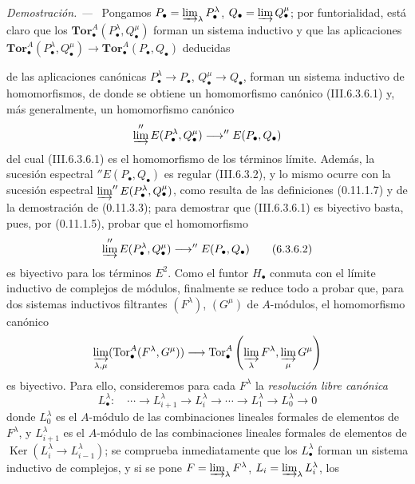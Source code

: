 \documentclass[10pt,oneside]{book}
\newcommand{\sref}[2][]{\textup{(#2)}}
\newcommand{\oldpage}[2][]{\setcounter{footnote}{0}\marginpar{\scriptsize\textbf{#1}~|~#2}\ignorespaces}
\newenvironment{proof}{\par\medskip\noindent\textit{Demostración. ---\ }}{\par}
\begin{document}
\begin{proof}
Pongamos $P_\bullet=\varinjlim_\lambda P_\bullet^\lambda$,
$Q_\bullet=\varinjlim Q_\bullet^\mu$; por funtorialidad, está claro que
los $\mathbf{Tor}_\bullet^A(P_\bullet^\lambda,Q_\bullet^\mu)$ forman un
sistema inductivo y que las aplicaciones
$\mathbf{Tor}_\bullet^A(P_\bullet^\lambda,Q_\bullet^\mu)\to
\mathbf{Tor}_\bullet^A(P_\bullet,Q_\bullet)$ deducidas

\oldpage[III]{143}

de las aplicaciones canónicas $P_\bullet^\lambda\to P_\bullet$,
$Q_\bullet^\mu\to Q_\bullet$, forman un sistema inductivo de homomorfismos,
de donde se obtiene un homomorfismo canónico \sref{III.6.3.6.1} y, más
generalmente,
un homomorfismo canónico
\[
  \varinjlim''E(P_\bullet^\lambda,Q_\bullet^\mu)
  \longrightarrow ''E(P_\bullet,Q_\bullet)
\]
del cual \sref{III.6.3.6.1} es el homomorfismo de los términos límite.
Además, la sucesión espectral $''E(P_\bullet,Q_\bullet)$ es regular
\sref{III.6.3.2}, y lo mismo
ocurre con la sucesión espectral
$\varinjlim''E(P_\bullet^\lambda,Q_\bullet^\mu)$, como resulta
de las definiciones \sref[0]{0.11.1.7} y de la demostración de
\sref[0]{0.11.3.3}; para demostrar que \sref{III.6.3.6.1} es biyectivo basta,
pues, por \sref[0]{0.11.1.5}, probar que el
homomorfismo
\[
  \varinjlim''E(P_\bullet^\lambda,Q_\bullet^\mu)
  \longrightarrow ''E(P_\bullet,Q_\bullet)
  \tag{6.3.6.2}\label{III.6.3.6.2}
\]
es biyectivo para los términos $E^2$. Como el funtor $H_\bullet$ conmuta con
el límite inductivo de complejos de módulos, finalmente se reduce todo a
probar que, para dos sistemas inductivos filtrantes $(F^\lambda)$,
$(G^\mu)$ de $A$-módulos, el homomorfismo canónico
\[
  \varinjlim_{\lambda,\mu}(\operatorname{Tor}_\bullet^A(F^\lambda,G^\mu))
  \longrightarrow
  \operatorname{Tor}_\bullet^A
  \left(\varinjlim_\lambda F^\lambda,
        \varinjlim_\mu G^\mu\right)
\]
es biyectivo. Para ello, consideremos para cada $F^\lambda$ la \emph{resolución
libre canónica}
\[
  L_\bullet^\lambda:\quad
  \cdots\longrightarrow L_{i+1}^\lambda
  \longrightarrow L_i^\lambda\longrightarrow\cdots
  \longrightarrow L_1^\lambda\longrightarrow L_0^\lambda\longrightarrow0
\]
donde $L_0^\lambda$ es el $A$-módulo de las combinaciones lineales formales
de elementos de $F^\lambda$, y $L_{i+1}^\lambda$ es el $A$-módulo de las
combinaciones lineales formales de elementos de
$\operatorname{Ker}(L_i^\lambda\to L_{i-1}^\lambda)$; se comprueba
inmediatamente que los $L_\bullet^\lambda$ forman un sistema inductivo de
complejos, y si se pone
$F=\varinjlim_\lambda F^\lambda$, $L_i=\varinjlim_\lambda L_i^\lambda$, los

\end{proof}
\end{document}
